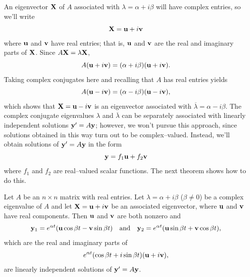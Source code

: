 An eigenvector $\mathbf{X}$ of $A$ associated with
$\lambda=\alpha+i\beta$ will have complex entries, so we'll write
\[
\mathbf{X}=\mathbf{u}+i\mathbf{v}
\]
where $\mathbf{u}$ and $\mathbf{v}$ have real entries; that is, $\mathbf{u}$
and $\mathbf{v}$ are the real and imaginary parts of $\mathbf{X}$. Since
$A\mathbf{X}=\lambda \mathbf{X}$,
\begin{equation} \label{eq:10.6.1}
A(\mathbf{u}+i\mathbf{v})=(\alpha+i\beta)(\mathbf{u}+i\mathbf{v}).
\end{equation}
Taking complex conjugates here and recalling that $A$ has real entries
yields
\[
A(\mathbf{u}-i\mathbf{v})=(\alpha-i\beta)(\mathbf{u}-i\mathbf{v}),
\]
which shows that $\mathbf{X}=\mathbf{u}-i\mathbf{v}$ is an eigenvector
associated with $\overline\lambda=\alpha-i\beta$. The complex
conjugate eigenvalues $\lambda$ and $\overline\lambda$ can be
separately associated with linearly independent solutions $\mathbf{y}'=A\mathbf{y}$;     however, we won't pursue this approach, since solutions
obtained in this way turn out to be complex--valued. Instead, we'll
obtain solutions of $\mathbf{y}'=A\mathbf{y}$ in the form
\begin{equation} \label{eq:10.6.2}
\mathbf{y}=f_1\mathbf{u}+f_2\mathbf{v}
\end{equation}
where $f_1$ and $f_2$ are real--valued scalar functions.
The next theorem shows how to do this.

\begin{theorem}\label{thmtype:10.6.1}
Let $A$ be an $n\times n$ matrix with real entries. Let
$\lambda=\alpha+i\beta$ ($\beta\ne0$) be a complex
eigenvalue of $A$ and let $\mathbf{X}=\mathbf{u}+i\mathbf{v}$ be an associated
eigenvector, where $\mathbf{u}$ and $\mathbf{v}$ have real components. Then
$\mathbf{u}$ and $\mathbf{v}$ are both nonzero and
\[
\mathbf{y}_1=e^{\alpha t}(\mathbf{u}\cos\beta t-\mathbf{v}\sin\beta t)
\quad\text{and}\quad
\mathbf{y}_2=e^{\alpha t}(\mathbf{u}\sin\beta t+\mathbf{v}\cos\beta t),
\]
which are the real and imaginary parts of
\begin{equation} \label{eq:10.6.3}
e^{\alpha t}(\cos\beta t+i\sin\beta t)(\mathbf{u}+i\mathbf{v}),
\end{equation}
are linearly independent solutions of  $\mathbf{y}'=A\mathbf{y}$.
\end{theorem}

